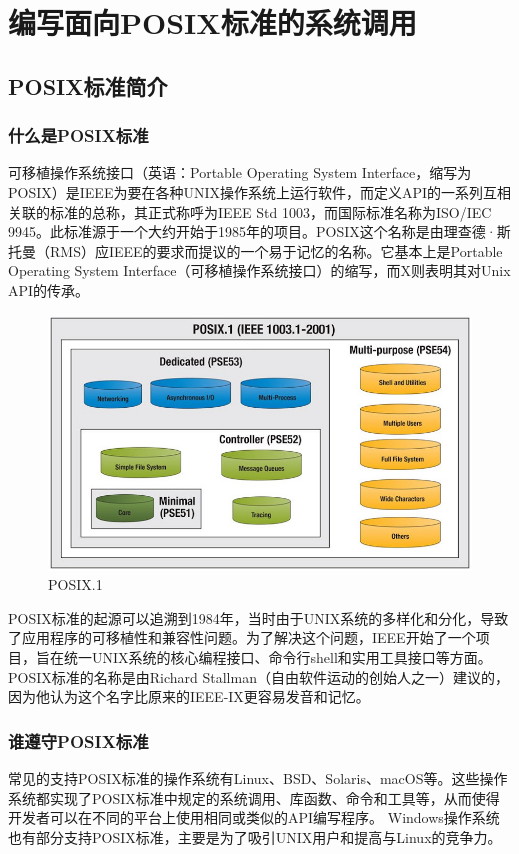 \chapter {编写面向POSIX标准的系统调用}
\section{POSIX标准简介}
\subsection{什么是POSIX标准} \par
可移植操作系统接口（英语：Portable Operating System Interface，缩写为POSIX）是IEEE为要在各种UNIX操作系统上运行软件，而定义API的一系列互相关联的标准的总称，其正式称呼为IEEE Std 1003，而国际标准名称为ISO/IEC 9945。此标准源于一个大约开始于1985年的项目。POSIX这个名称是由理查德·斯托曼（RMS）应IEEE的要求而提议的一个易于记忆的名称。它基本上是Portable Operating System Interface（可移植操作系统接口）的缩写，而X则表明其对Unix API的传承。

\begin{figure}[ht]
	\centering
	\includegraphics[width=\textwidth]{figures/09-01-posix-ieee.jpg}
	\caption{POSIX.1}
	\label{fig:POSIX.1}
\end{figure}

POSIX标准的起源可以追溯到1984年，当时由于UNIX系统的多样化和分化，导致了应用程序的可移植性和兼容性问题。为了解决这个问题，IEEE开始了一个项目，旨在统一UNIX系统的核心编程接口、命令行shell和实用工具接口等方面。 POSIX标准的名称是由Richard Stallman（自由软件运动的创始人之一）建议的，因为他认为这个名字比原来的IEEE-IX更容易发音和记忆。

\subsection{谁遵守POSIX标准} \par
常见的支持POSIX标准的操作系统有Linux、BSD、Solaris、macOS等。这些操作系统都实现了POSIX标准中规定的系统调用、库函数、命令和工具等，从而使得开发者可以在不同的平台上使用相同或类似的API编写程序。 Windows操作系统也有部分支持POSIX标准，主要是为了吸引UNIX用户和提高与Linux的竞争力。

